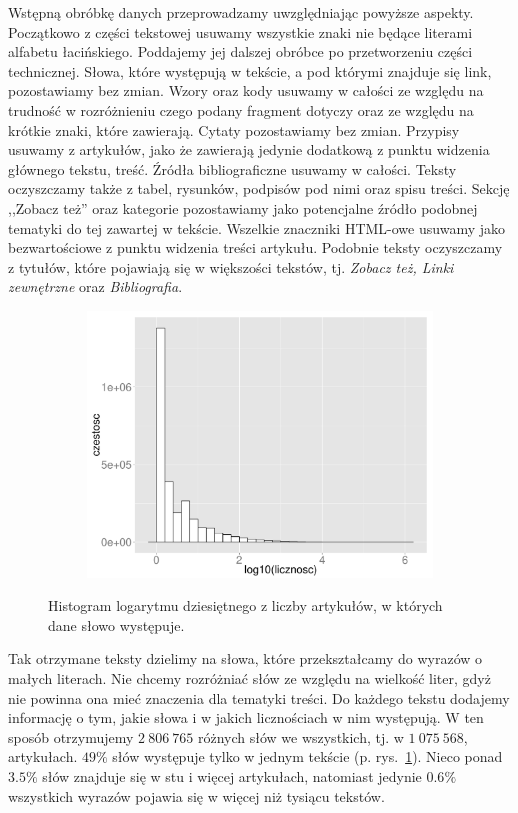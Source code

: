 \documentclass{praca1}
\begin{document}
Wstępną obróbkę danych przeprowadzamy uwzględniając powyższe aspekty. Początkowo z części tekstowej usuwamy wszystkie znaki nie będące literami alfabetu łacińskiego. Poddajemy jej dalszej obróbce po przetworzeniu części technicznej. Słowa, które występują w tekście, a pod którymi znajduje się link, pozostawiamy bez zmian. Wzory oraz kody usuwamy w całości ze względu na trudność w rozróżnieniu czego podany fragment dotyczy oraz ze względu na krótkie znaki, które zawierają. Cytaty pozostawiamy bez zmian. Przypisy usuwamy z artykułów, jako że zawierają jedynie dodatkową z punktu widzenia głównego tekstu, treść. Źródła bibliograficzne usuwamy w całości. Teksty oczyszczamy także z tabel, rysunków, podpisów pod nimi oraz spisu treści. Sekcję ,,Zobacz też'' oraz kategorie pozostawiamy jako potencjalne źródło podobnej tematyki do tej zawartej w tekście. Wszelkie znaczniki HTML-owe usuwamy jako bezwartościowe z punktu widzenia treści artykułu. Podobnie teksty oczyszczamy z tytułów, które pojawiają się w większości tekstów, tj. \emph{Zobacz też, Linki zewnętrzne} oraz \emph{Bibliografia}.

\begin{figure}[!h]
  \centering
  \includegraphics[width=350pt, height=200pt]{plot1.pdf}\\
  \caption{Histogram logarytmu dziesiętnego z liczby artykułów, w których dane słowo występuje.}\label{plot:001}
\end{figure}


Tak otrzymane teksty dzielimy na słowa, które przekształcamy do wyrazów o małych literach. Nie chcemy rozróżniać słów ze względu na wielkość liter, gdyż nie powinna ona mieć znaczenia dla tematyki treści. Do każdego tekstu dodajemy informację o tym, jakie słowa i w jakich licznościach w nim występują. W ten sposób otrzymujemy $2\ 806\ 765$ różnych słów we wszystkich, tj. w $1\ 075\ 568$, artykułach. $49\%$ słów występuje tylko w jednym tekście (p. rys.~\ref{plot:001}). Nieco ponad $3.5\%$ słów znajduje się w stu i więcej artykułach, natomiast jedynie $0.6\%$ wszystkich wyrazów pojawia się w więcej niż tysiącu tekstów.
\end{document}
